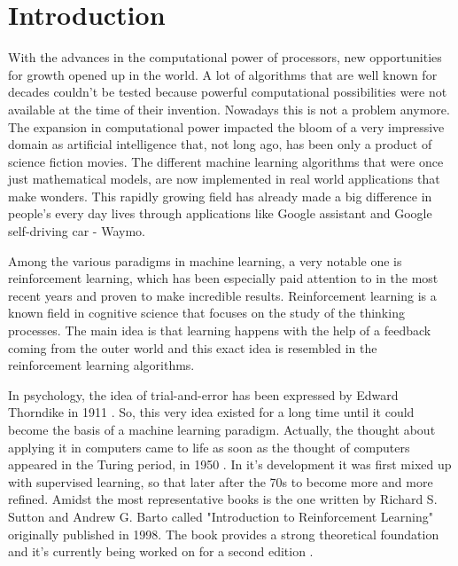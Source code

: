 \chapter{Introduction}\label{Introduction}
With the advances in the computational power of processors, new opportunities for growth opened up in the world. A lot of algorithms that are well known for decades couldn't be tested because powerful computational possibilities were not available at the time of their invention. Nowadays this is not a problem anymore. The expansion in computational power impacted the bloom of a very impressive domain as artificial intelligence that, not long ago, has been only a product of science fiction movies. The different machine learning algorithms that were once just mathematical models, are now implemented in real world applications that make wonders. This rapidly growing field has already made a big difference in people's every day lives through applications like Google assistant and Google self-driving car - Waymo.

Among the various paradigms in machine learning, a very notable one is reinforcement learning, which has been especially paid attention to in the most recent years and proven to make incredible results. Reinforcement learning is a known field in cognitive science that focuses on the study of the thinking processes. The main idea is that learning happens with the help of a feedback coming from the outer world and this exact idea is resembled in the reinforcement learning algorithms. 

In psychology, the idea of trial-and-error has been expressed by Edward Thorndike in 1911 \cite{Sutton:1998:IRL:551283}. So, this very idea existed for a long time until it could become the basis of a machine learning paradigm. Actually, the thought about applying it in computers came to life as soon as the thought of computers appeared in the Turing period, in 1950 \cite{Sutton:1998:IRL:551283}. In it's development it was first mixed up with supervised learning, so that later after the 70s to become more and more refined. Amidst the most representative books is the one written by Richard S. Sutton and Andrew G. Barto called "Introduction to Reinforcement Learning" \cite{Sutton:1998:IRL:551283} originally published in 1998. The book \cite{Sutton:1998:IRL:551283} provides a strong theoretical foundation and it's currently being worked on for a second edition \cite{Sutton}.

